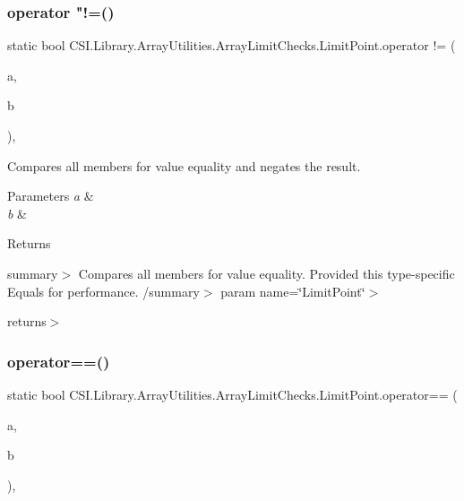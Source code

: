 \subsubsection{\texorpdfstring{operator "!=()}{operator !=()}}
{\footnotesize\ttfamily static bool C\+S\+I.\+Library.\+Array\+Utilities.\+Array\+Limit\+Checks.\+Limit\+Point.\+operator != (\begin{DoxyParamCaption}\item[{\mbox{\hyperlink{class_c_s_i_1_1_library_1_1_array_utilities_1_1_array_limit_checks_1_1_limit_point}{Limit\+Point}}}]{a,  }\item[{\mbox{\hyperlink{class_c_s_i_1_1_library_1_1_array_utilities_1_1_array_limit_checks_1_1_limit_point}{Limit\+Point}}}]{b }\end{DoxyParamCaption})\hspace{0.3cm}{\ttfamily [inline]}, {\ttfamily [static]}}



Compares all members for value equality and negates the result. 


\begin{DoxyParams}{Parameters}
{\em a} & \\
\hline
{\em b} & \\
\hline
\end{DoxyParams}
\begin{DoxyReturn}{Returns}

\end{DoxyReturn}
summary$>$ Compares all members for value equality. Provided this type-\/specific Equals for performance. /summary$>$ param name=\char`\"{}\+Limit\+Point\char`\"{}$>$

returns$>$\mbox{\label{class_c_s_i_1_1_library_1_1_array_utilities_1_1_array_limit_checks_1_1_limit_point_a81b0681d6e544eaa37b7d08857b568f1}} 
\subsubsection{\texorpdfstring{operator==()}{operator==()}}
{\footnotesize\ttfamily static bool C\+S\+I.\+Library.\+Array\+Utilities.\+Array\+Limit\+Checks.\+Limit\+Point.\+operator== (\begin{DoxyParamCaption}\item[{\mbox{\hyperlink{class_c_s_i_1_1_library_1_1_array_utilities_1_1_array_limit_checks_1_1_limit_point}{Limit\+Point}}}]{a,  }\item[{\mbox{\hyperlink{class_c_s_i_1_1_library_1_1_array_utilities_1_1_array_limit_checks_1_1_limit_point}{Limit\+Point}}}]{b }\end{DoxyParamCaption})\hspace{0.3cm}{\ttfamily [inline]}, {\ttfamily [static]}}



